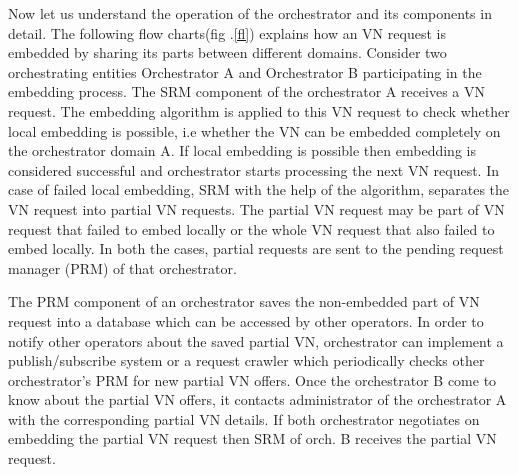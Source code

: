 \documentclass[article,dr=phil,type=msc ,colorback,accentcolor=tud4b]{tudthesis}
\begin{document}
Now let us understand the operation of the orchestrator and its components in detail. The following flow charts(fig .\ref{fl}) explains how an VN request is embedded by sharing its parts between different domains. Consider two orchestrating entities Orchestrator A and Orchestrator B participating in the embedding process. The SRM component of the orchestrator A receives a VN request. The embedding algorithm is applied to this VN request to check whether local embedding is possible, i.e whether the VN can be embedded completely on the orchestrator domain A. If local embedding is possible then embedding is considered successful and orchestrator starts processing the next VN request. In case of failed local embedding, SRM with the help of the algorithm, separates the VN request into partial VN requests. The partial VN request may be part of VN request that failed to embed locally or the whole VN request that also failed to embed locally. In both the cases, partial requests are sent to the pending request manager (PRM) of that orchestrator.

The PRM component of an orchestrator saves the non-embedded part of VN request into a database which can be accessed by other operators. In order to notify other operators about the saved partial VN, orchestrator can implement a publish/subscribe system or a request crawler which periodically checks other orchestrator's PRM for new partial VN offers. Once the orchestrator B come to know about the partial VN offers, it contacts administrator of the orchestrator A with the corresponding partial VN details. If both orchestrator negotiates on embedding the partial VN request then SRM of orch. B receives the partial VN request. \newline
\end{document}

